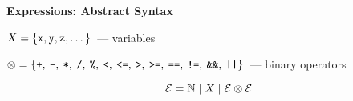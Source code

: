 \centering

\textbf{Expressions: Abstract Syntax}
\vskip1cm

$X=\{\cd{x}, \cd{y}, \cd{z}, \dots\}$~--- variables
\vskip 7mm

$\otimes=\{\cd{+},\:\cd{-},\:\cd{*},\:\cd{/},\:\cd{\%},\:\cd{<},\:\cd{<=},\:\cd{>},\:\cd{>=},\:\cd{==},\:\cd{!=},\:\cd{\&\&},\:\cd{||}\}$~--- binary operators

$$
{\cal E}=\NN\mid X \mid {\cal E}\otimes{\cal E}
$$

